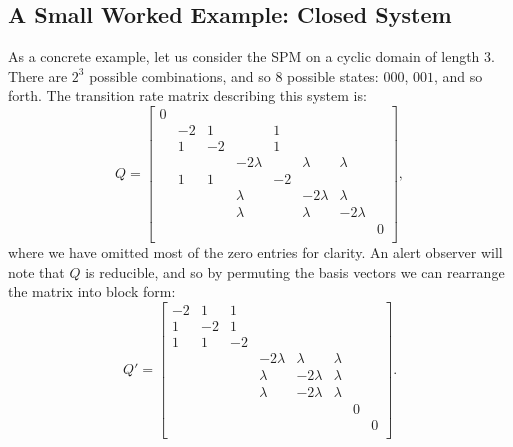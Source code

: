 \subsection{A Small Worked Example: Closed System} \label{sec:workedExampleClosed}

As a concrete example, let us consider the SPM on a cyclic domain of length $3$. There
are $2^3$ possible combinations, and so $8$ possible states: $000$, $001$, and so forth.
The transition rate matrix describing this system is:
\begin{equation}
 Q =
 \begin{bmatrix}
0  &   &   &           &   &   &   &   \\
   &-2 & 1 &           & 1 &   &   &   \\
   & 1 &-2 &           & 1 &   &   &   \\
   &   &   & -2\lambda &   &  \lambda &  \lambda &   \\
   & 1 & 1 &           & -2&   &   &   \\
   &   &   &  \lambda    &   &  -2\lambda & \lambda  &   \\
   &   &   &  \lambda  &    & \lambda  & -2 \lambda &   \\
   &   &   &           &   &   &   & 0  \\
\end{bmatrix},
\end{equation}
where we have omitted most of the zero entries for clarity.
An alert observer will note that $Q$ is reducible, and so by permuting the basis vectors
we can rearrange the matrix into block form:
\begin{equation}
 Q ' = 
 \begin{bmatrix}
-2  & 1 & 1 &           &   &   &   &   \\
 1 &-2 & 1 &           &  &   &   &   \\
 1 & 1 &-2 &           &  &   &   &   \\
   &   &   & -2\lambda & \lambda &  \lambda &   &    \\
   &   &   &      \lambda& -2\lambda   &  \lambda &   \\
   &   &   &  \lambda   &   -2\lambda & \lambda & &   \\
   &   &   &       &  &  & 0 &  \\
   &   &   &           &   &   &   & 0  \\
\end{bmatrix}.
\end{equation}

